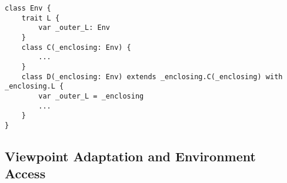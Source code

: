 \begin{lstlisting}[float=htbp, caption={Base Class and Trait with Environment References}, label={lst:base-class-trait-env-ref}]
class Env {
	trait L {
		var _outer_L: Env
	}
	class C(_enclosing: Env) {
		...
	}
	class D(_enclosing: Env) extends _enclosing.C(_enclosing) with _enclosing.L {
		var _outer_L = _enclosing
		...
	}
}
\end{lstlisting}

\subsection{Viewpoint Adaptation and Environment Access}




\begin{comment}


Some translation is performed on constructor calls to handle synthetic outer references, and this translation is related to path-dependent types. In Dotty, types are {\em path-dependent}. The class name {\cd D} by itself is not a type; where~{\cd D} is used without a prefix path, an appropriate prefix path is assumed. (typically \mbox{\cd C.this}, where~{\cd C} is )

In general, for any class~{\cd D} that 

\begin{lstlisting}[float=htbp, caption={}, label={lst:}]
class C {
	class D(_enclosing: C) {
	}
	new D()
	new C.this.D()  // with explicit path prefix
	new C.this.D(C.this)  // with explicit outer reference
}
\end{lstlisting}




\begin{lstlisting}[float=htbp, caption={Method Transformation 4 (Flattening)}, label={lst:meth-4}]
class C { this =>
	val y = (new _M(this, x))._result
}
class _M(this: C, _x: S) = {
	val _outer = this
	val x = _x
	...
	val _result = resultExpr
}
\end{lstlisting}

\end{comment}
